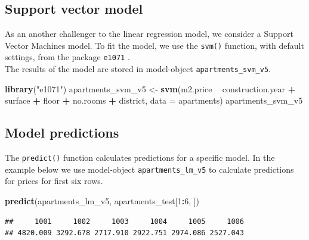 \documentclass[]{krantz}
\newenvironment{Shaded}{\begin{snugshade}}{\end{snugshade}}
\newcommand{\DataTypeTok}[1]{\textcolor[rgb]{0.13,0.29,0.53}{#1}}
\newcommand{\DecValTok}[1]{\textcolor[rgb]{0.00,0.00,0.81}{#1}}
\newcommand{\KeywordTok}[1]{\textcolor[rgb]{0.13,0.29,0.53}{\textbf{#1}}}
\newcommand{\NormalTok}[1]{#1}
\newcommand{\OperatorTok}[1]{\textcolor[rgb]{0.81,0.36,0.00}{\textbf{#1}}}
\newcommand{\StringTok}[1]{\textcolor[rgb]{0.31,0.60,0.02}{#1}}
\begin{document}
\hypertarget{model-Apartments-svm}{%
\subsection{Support vector model}\label{model-Apartments-svm}}

As an another challenger to the linear regression model, we consider a Support Vector Machines model. To fit the model, we use the \texttt{svm()} function, with default settings, from the package \texttt{e1071} \citep{R-e1071}.\\
The results of the model are stored in model-object \texttt{apartments\_svm\_v5}.

\begin{Shaded}
\begin{Highlighting}[]
\KeywordTok{library}\NormalTok{(}\StringTok{"e1071"}\NormalTok{)}
\NormalTok{apartments_svm_v5 <-}\StringTok{ }\KeywordTok{svm}\NormalTok{(m2.price }\OperatorTok{~}\StringTok{ }\NormalTok{construction.year }\OperatorTok{+}\StringTok{ }\NormalTok{surface }\OperatorTok{+}\StringTok{ }\NormalTok{floor }\OperatorTok{+}\StringTok{ }
\StringTok{         }\NormalTok{no.rooms }\OperatorTok{+}\StringTok{ }\NormalTok{district, }\DataTypeTok{data =}\NormalTok{ apartments)}
\NormalTok{apartments_svm_v5}
\end{Highlighting}
\end{Shaded}

\hypertarget{predictionsApartments}{%
\subsection{Model predictions}\label{predictionsApartments}}

The \texttt{predict()} function calculates predictions for a specific model. In the example below we use model-object \texttt{apartments\_lm\_v5} to calculate predictions for prices for first six rows.

\begin{Shaded}
\begin{Highlighting}[]
\KeywordTok{predict}\NormalTok{(apartments_lm_v5, apartments_test[}\DecValTok{1}\OperatorTok{:}\DecValTok{6}\NormalTok{, ])}
\end{Highlighting}
\end{Shaded}

\begin{verbatim}
##     1001     1002     1003     1004     1005     1006 
## 4820.009 3292.678 2717.910 2922.751 2974.086 2527.043
\end{verbatim}
\end{document}
